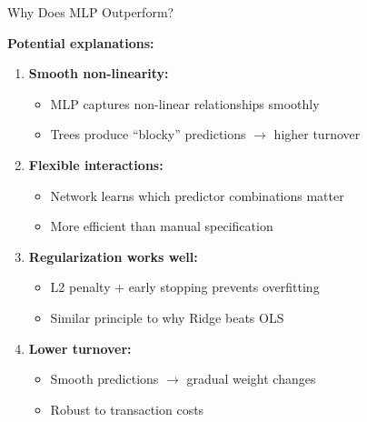 \documentclass[10pt]{beamer}
\begin{document}
\begin{frame}{Why Does MLP Outperform?}

  \textbf{Potential explanations:}

  \vspace{0.5em}
  \begin{enumerate}
    \item \textbf{Smooth non-linearity:}
    \begin{itemize}
      \item MLP captures non-linear relationships smoothly
      \item Trees produce ``blocky'' predictions $\rightarrow$ higher turnover
    \end{itemize}

    \vspace{0.5em}
    \item \textbf{Flexible interactions:}
    \begin{itemize}
      \item Network learns which predictor combinations matter
      \item More efficient than manual specification
    \end{itemize}

    \vspace{0.5em}
    \item \textbf{Regularization works well:}
    \begin{itemize}
      \item L2 penalty + early stopping prevents overfitting
      \item Similar principle to why Ridge beats OLS
    \end{itemize}

    \vspace{0.5em}
    \item \textbf{Lower turnover:}
    \begin{itemize}
      \item Smooth predictions $\rightarrow$ gradual weight changes
      \item Robust to transaction costs
    \end{itemize}
  \end{enumerate}
\end{frame}

\end{document}
